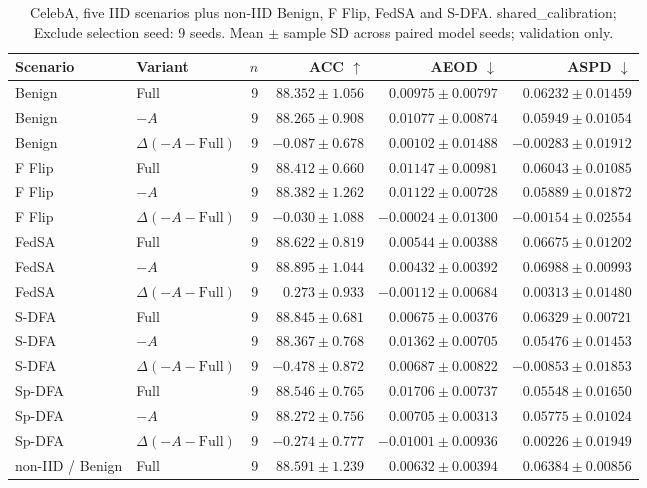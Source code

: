 \begin{table}[t]
\centering
\small
\caption{CelebA, five IID scenarios plus non-IID Benign, F Flip, FedSA and S-DFA. shared\_calibration; Exclude selection seed: 9 seeds. Mean $\pm$ sample SD across paired model seeds; validation only.}
\begin{tabular}{llrrrr}
\toprule
Scenario & Variant & $n$ & ACC $\uparrow$ & AEOD $\downarrow$ & ASPD $\downarrow$ \\
\midrule
Benign & Full & 9 & $88.352 \pm 1.056$ & $0.00975 \pm 0.00797$ & $0.06232 \pm 0.01459$ \\
Benign & $-A$ & 9 & $88.265 \pm 0.908$ & $0.01077 \pm 0.00874$ & $0.05949 \pm 0.01054$ \\
Benign & $\Delta(-A-\mathrm{Full})$ & 9 & $-0.087 \pm 0.678$ & $0.00102 \pm 0.01488$ & $-0.00283 \pm 0.01912$ \\
F Flip & Full & 9 & $88.412 \pm 0.660$ & $0.01147 \pm 0.00981$ & $0.06043 \pm 0.01085$ \\
F Flip & $-A$ & 9 & $88.382 \pm 1.262$ & $0.01122 \pm 0.00728$ & $0.05889 \pm 0.01872$ \\
F Flip & $\Delta(-A-\mathrm{Full})$ & 9 & $-0.030 \pm 1.088$ & $-0.00024 \pm 0.01300$ & $-0.00154 \pm 0.02554$ \\
FedSA & Full & 9 & $88.622 \pm 0.819$ & $0.00544 \pm 0.00388$ & $0.06675 \pm 0.01202$ \\
FedSA & $-A$ & 9 & $88.895 \pm 1.044$ & $0.00432 \pm 0.00392$ & $0.06988 \pm 0.00993$ \\
FedSA & $\Delta(-A-\mathrm{Full})$ & 9 & $0.273 \pm 0.933$ & $-0.00112 \pm 0.00684$ & $0.00313 \pm 0.01480$ \\
S-DFA & Full & 9 & $88.845 \pm 0.681$ & $0.00675 \pm 0.00376$ & $0.06329 \pm 0.00721$ \\
S-DFA & $-A$ & 9 & $88.367 \pm 0.768$ & $0.01362 \pm 0.00705$ & $0.05476 \pm 0.01453$ \\
S-DFA & $\Delta(-A-\mathrm{Full})$ & 9 & $-0.478 \pm 0.872$ & $0.00687 \pm 0.00822$ & $-0.00853 \pm 0.01853$ \\
Sp-DFA & Full & 9 & $88.546 \pm 0.765$ & $0.01706 \pm 0.00737$ & $0.05548 \pm 0.01650$ \\
Sp-DFA & $-A$ & 9 & $88.272 \pm 0.756$ & $0.00705 \pm 0.00313$ & $0.05775 \pm 0.01024$ \\
Sp-DFA & $\Delta(-A-\mathrm{Full})$ & 9 & $-0.274 \pm 0.777$ & $-0.01001 \pm 0.00936$ & $0.00226 \pm 0.01949$ \\
non-IID / Benign & Full & 9 & $88.591 \pm 1.239$ & $0.00632 \pm 0.00394$ & $0.06384 \pm 0.00856$ \\

\end{tabular}
\end{table}
